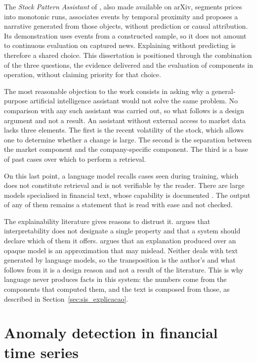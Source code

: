 The \emph{Stock Pattern Assistant} of \textcite{neela2025spa}, also made available on arXiv,
segments prices into monotonic runs, associates events by temporal proximity and proposes a
narrative generated from those objects, without prediction or causal attribution. Its demonstration
uses events from a constructed sample, so it does not amount to continuous evaluation on captured
news. Explaining without predicting is therefore a shared choice. This dissertation is positioned
through the combination of the three questions, the evidence delivered and the evaluation of
components in operation, without claiming priority for that choice.

The most reasonable objection to the work consists in asking why a general-purpose artificial
intelligence assistant would not solve the same problem. No comparison with any such assistant was
carried out, so what follows is a design argument and not a result. An assistant without external
access to market data lacks three elements. The first is the recent volatility of the stock, which
allows one to determine whether a change is large. The second is the separation between the market
component and the company-specific component. The third is a base of past cases over which to
perform a retrieval.

On this last point, a language model recalls cases seen during training, which does not constitute
retrieval and is not verifiable by the reader. There are large models specialised in financial
text, whose capability is documented \autocite{li2023llmfinance}. The output of any of them remains
a statement that is read with ease and not checked.

The explainability literature gives reasons to distrust it. \textcite{lipton2018mythos} argues that
interpretability does not designate a single property and that a system should declare which of
them it offers. \textcite{rudin2019stop} argues that an explanation produced over an opaque model
is an approximation that may mislead. Neither deals with text generated by language models, so the
transposition is the author's and what follows from it is a design reason and not a result of the
literature. This is why language never produces facts in this system: the numbers come from the
components that computed them, and the text is composed from those, as described in
Section~\ref{sec:sis_explicacao}.

\section{Anomaly detection in financial time series}
\label{sec:ctx_anomalias}

